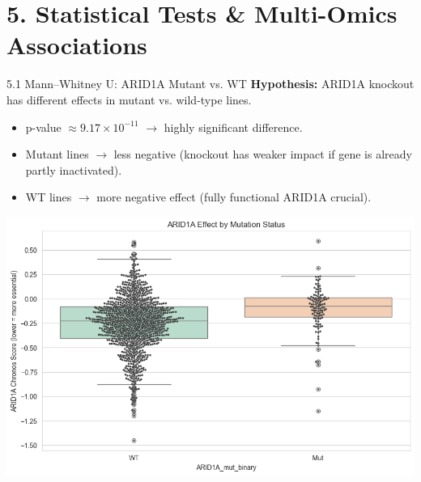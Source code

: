 \documentclass[10pt]{beamer}
\begin{document}
\section{5. Statistical Tests \& Multi-Omics Associations}

\begin{frame}{5.1 Mann--Whitney U: ARID1A Mutant vs. WT}
  \textbf{Hypothesis:} ARID1A knockout has different effects in mutant vs. wild-type lines.
  \begin{itemize}
    \item p-value \(\approx 9.17 \times 10^{-11}\) \(\to\) highly significant difference.
    \item Mutant lines \(\to\) less negative (knockout has weaker impact if gene is already partly inactivated).
    \item WT lines \(\to\) more negative effect (fully functional ARID1A crucial).
  \end{itemize}

  \vspace{0.3cm}
  \begin{center}
    \includegraphics[width=0.7\linewidth]{figs/arid1a_mw_boxplot.png}
  \end{center}
\end{frame}
\end{document}
